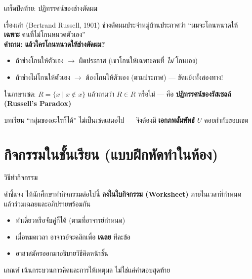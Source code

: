 \begin{frame}{เกร็ดปิดท้าย: ปฏิทรรศน์ของช่างตัดผม}
  \begin{block}{เรื่องเล่า (Bertrand Russell, 1901)}
    ช่างตัดผมประจำหมู่บ้านประกาศว่า ``ผมจะโกนหนวดให้ \textbf{เฉพาะ} คนที่ไม่โกนหนวดตัวเอง''
    \\ \centering \textbf{คำถาม: แล้วใครโกนหนวดให้ช่างตัดผม?}
  \end{block}
  \vspace{0.3em}
  \begin{itemize}
    \item ถ้าช่างโกนให้ตัวเอง $\rightarrow$ ผิดประกาศ (เขาโกนให้เฉพาะคนที่ \emph{ไม่} โกนเอง)
    \item ถ้าช่างไม่โกนให้ตัวเอง $\rightarrow$ ต้องโกนให้ตัวเอง (ตามประกาศ) --- ขัดแย้งทั้งสองทาง!
  \end{itemize}
  \vspace{0.3em}
  ในภาษาเซต: $R = \{x \mid x \notin x\}$ แล้วถามว่า $R \in R$ หรือไม่ ---
  คือ \textbf{ปฏิทรรศน์ของรัสเซลล์ (Russell's Paradox)}
  \vspace{0.3em}
  \begin{exampleblock}{บทเรียน}
    ``กลุ่มของอะไรก็ได้'' ไม่เป็นเซตเสมอไป --- จึงต้องมี \textbf{เอกภพสัมพัทธ์ $U$} คอยกำกับขอบเขต
  \end{exampleblock}
\end{frame}


\section{กิจกรรมในชั้นเรียน (แบบฝึกหัดทำในห้อง)}

\begin{frame}{วิธีทำกิจกรรม}
  \begin{block}{คำชี้แจง}
    ให้นักศึกษาทำกิจกรรมต่อไปนี้ \textbf{ลงในใบกิจกรรม (Worksheet)} ภายในเวลาที่กำหนด
    แล้วร่วมเฉลยและอภิปรายพร้อมกัน
  \end{block}
  \vspace{0.5em}
  \begin{itemize}
    \item ทำเดี่ยวหรือจับคู่ก็ได้ (ตามที่อาจารย์กำหนด)
    \item เมื่อหมดเวลา อาจารย์จะคลิกเพื่อ \textbf{เฉลย} ทีละข้อ
    \item อาสาสมัครออกมาอธิบายวิธีคิดหน้าชั้น
  \end{itemize}
  \vspace{0.5em}
  \begin{exampleblock}{เกณฑ์}
    เน้นกระบวนการคิดและการให้เหตุผล ไม่ใช่แค่คำตอบสุดท้าย
  \end{exampleblock}
\end{frame}

